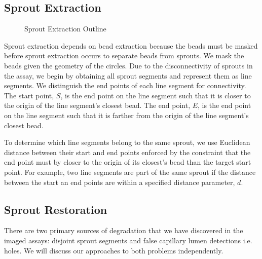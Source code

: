 \documentclass{sig-alternate}
\begin{document}
	\subsection{Sprout Extraction} %
	\label{sub:Sprout Extraction}
		\begin{figure}[htp!]
			\centering
			\caption{Sprout Extraction Outline}
			\label{fig:beadex}
		\end{figure}
		Sprout extraction depends on bead extraction because the beads must be
		masked before sprout extraction occurs to separate beads from sprouts.
		We mask the beads given the geometry of the circles. Due to the
		disconnectivity of sprouts in the assay, we begin by obtaining all
		sprout segments and represent them as line segments. We distinguish the
		end points of each line segment for connectivity. The start point, $S$,
		is the end point on the line segment such that it is closer to the
		origin of the line segment's closest bead. The end point, $E$, is the
		end point on the line segment such that it is farther from the origin
		of the line segment's closest bead.

		To determine which line segments belong to the same sprout, we use
		Euclidean distance between their start and end points enforced by
		the constraint that the end point must by closer to the origin of
		its closest's bead than the target start point. For example, two
		line segments are part of the same sprout if the distance between
		the start an end points are within a specified distance parameter,
		$d$.

	\subsection{Sprout Restoration} %
	\label{sub:Sprout Restoration}
		There are two primary sources of degradation that we have discovered in
		the imaged assays: disjoint sprout segments and false capillary lumen
		detections i.e. holes. We will discuss our approaches to both problems
		independently. 
		
\end{document}
